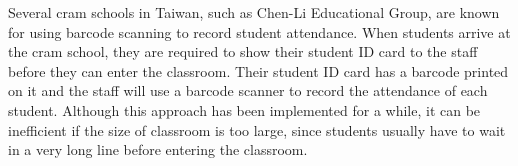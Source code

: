 Several cram schools in Taiwan, such as Chen-Li Educational Group, are known for
using barcode scanning to record student attendance. When students arrive at the
cram school, they are required to show their student ID card to the staff before
they can enter the classroom. Their student ID card has a barcode printed on it
and the staff will use a barcode scanner to record the attendance of each student.
Although this approach has been implemented for a while, it can be inefficient
if the size of classroom is too large, since students usually have to wait
in a very long line before entering the classroom.
